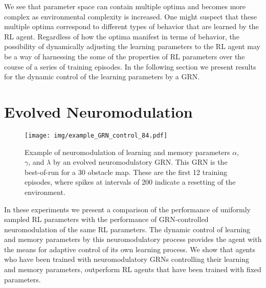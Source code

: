 \documentclass[conference]{IEEEtran}
\begin{document}
We see that parameter space can contain multiple optima and becomes more complex
as environmental complexity is increased. One might suspect that these multiple
optima correspond to different types of behavior that are learned by the RL agent.
Regardless of how the optima manifest in terms of behavior, the possibility of
dynamically adjusting the learning parameters to the RL agent may be a way of
harnessing the some of the properties of RL parameters over the course of a
series of training episodes. In the following section we present results for the 
dynamic control of the learning parameters by a GRN.



\section{Evolved Neuromodulation}

\begin{figure*}
\centering
\texttt{[image: img/example\_GRN\_control\_84.pdf]}
\caption{Example of neuromodulation of learning and memory parameters $\alpha$, $\gamma$, and $\lambda$ by an evolved neuromodulatory GRN. 
This GRN is the best-of-run for a 30 obstacle map. These are the first 12
training episodes, where spikes at intervals of 200 indicate a resetting of the
environment.}
\vspace{-5pt}
\label{fig:exampleGRN}
\end{figure*}

In these experiments we present a comparison of the performance of uniformly
sampled RL parameters with the performance of GRN-controlled neuromodulation of
the same RL parameters. The dynamic control of learning and memory parameters by
this neuromodulatory process provides the agent with the means for adaptive
control of its own learning process. We show that agents who have been trained
with neuromodulatory GRNs controlling their learning and memory parameters, 
outperform RL agents that have been trained with fixed parameters. 
\end{document}
